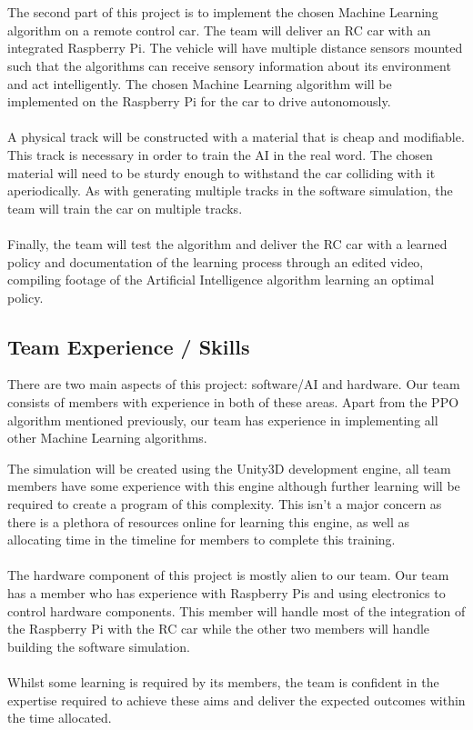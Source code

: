 \documentclass[8pt]{article}
\begin{document}
\\\\
The second part of this project is to implement the chosen Machine Learning algorithm on a remote control car. The team will deliver an RC car with an integrated Raspberry Pi. The vehicle will have multiple distance sensors mounted such that the algorithms can receive sensory information about its environment and act intelligently. The chosen Machine Learning algorithm will be implemented on the Raspberry Pi for the car to drive autonomously.
\\\\
A physical track will be constructed with a material that is cheap and modifiable. This track is necessary in order to train the AI in the real word. The chosen material will need to be sturdy enough to withstand the car colliding with it aperiodically. As with generating multiple tracks in the software simulation, the team will train the car on multiple tracks.
\\\\
Finally, the team will test the algorithm and deliver the RC car with a learned policy and documentation of the learning process through an edited video, compiling footage of the Artificial Intelligence algorithm learning an optimal policy.

\subsection{Team Experience / Skills}
There are two main aspects of this project: software/AI and hardware. Our team consists of members with experience in both of these areas. Apart from the PPO algorithm mentioned previously, our team has experience in implementing all other Machine Learning algorithms. 

\newpage



%
%
%

The simulation will be created using the Unity3D development engine, all team members have some experience with this engine although further learning will be required to create a program of this complexity. This isn't a major concern as there is a plethora of resources online for learning this engine, as well as allocating time in the timeline for members to complete this training.
\\\\
The hardware component of this project is mostly alien to our team. Our team has a member who has experience with Raspberry Pis and using electronics to control hardware components. This member will handle most of the integration of the Raspberry Pi with the RC car while the other two members will handle building the software simulation.
\\\\
Whilst some learning is required by its members, the team is confident in the expertise required to achieve these aims and deliver the expected outcomes within the time allocated.
\end{document}
